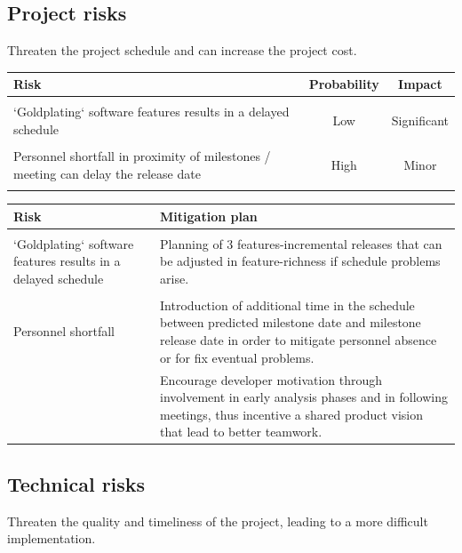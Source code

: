 \documentclass[english]{article}
\begin{document}
	\subsection{Project risks}
	Threaten the project schedule and can increase the project cost.

	\begin{table}[H]
		\centering
		\begin{tabular}{ p{7cm} c c }
		\textbf{Risk} & \textbf{Probability} & \textbf{Impact} \\ \hline \\
		`Goldplating` software features results in a delayed schedule & Low & Significant \\ \\
		Personnel shortfall in proximity of milestones / meeting can delay the release date & High & Minor \\ \\
		\end{tabular}
	\end{table}
	
	\begin{table}[H]
		\centering
		\begin{tabular}{ p{5cm} p{6cm} }
		\textbf{Risk} & \textbf{Mitigation plan} \\ \hline \\ 
		`Goldplating` software features results in a delayed schedule & Planning of 3 features-incremental releases that can be adjusted in feature-richness if schedule problems arise. \\ 		\\
		Personnel shortfall & Introduction of additional time in the schedule between predicted milestone date and milestone release date in order to mitigate personnel absence or for fix eventual problems. 	\\ 
		& Encourage developer motivation through involvement in early analysis phases and in following meetings, thus incentive a shared product vision that lead to better teamwork. \\	
		\end{tabular}
	\end{table}
	
	
	\subsection{Technical risks}
	Threaten the quality and timeliness of the project,  leading to a more difficult implementation.
\end{document}
